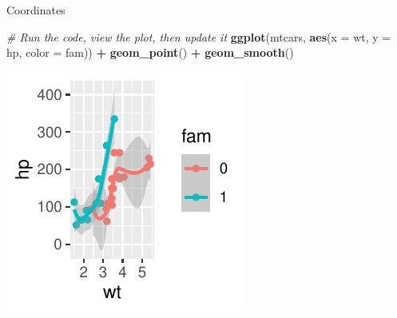 \documentclass[
  ignorenonframetext,
]{beamer}
\newenvironment{Shaded}{\begin{snugshade}}{\end{snugshade}}
\newcommand{\AttributeTok}[1]{\textcolor[rgb]{0.13,0.29,0.53}{#1}}
\newcommand{\CommentTok}[1]{\textcolor[rgb]{0.56,0.35,0.01}{\textit{#1}}}
\newcommand{\FunctionTok}[1]{\textcolor[rgb]{0.13,0.29,0.53}{\textbf{#1}}}
\newcommand{\NormalTok}[1]{#1}
\newcommand{\SpecialCharTok}[1]{\textcolor[rgb]{0.81,0.36,0.00}{\textbf{#1}}}
\begin{document}
\begin{frame}[fragile]{Coordinates}
\label{coordinates-6}

\begin{Shaded}
\begin{Highlighting}[]
\CommentTok{\# Run the code, view the plot, then update it}
\FunctionTok{ggplot}\NormalTok{(mtcars, }\FunctionTok{aes}\NormalTok{(}\AttributeTok{x =}\NormalTok{ wt, }\AttributeTok{y =}\NormalTok{ hp, }\AttributeTok{color =}\NormalTok{ fam)) }\SpecialCharTok{+} \FunctionTok{geom\_point}\NormalTok{() }\SpecialCharTok{+}
    \FunctionTok{geom\_smooth}\NormalTok{()}
\end{Highlighting}
\end{Shaded}

\begin{center}\includegraphics[width=0.5\linewidth]{Figs/unnamed-chunk-38-1} \end{center}
\end{frame}
\end{document}
